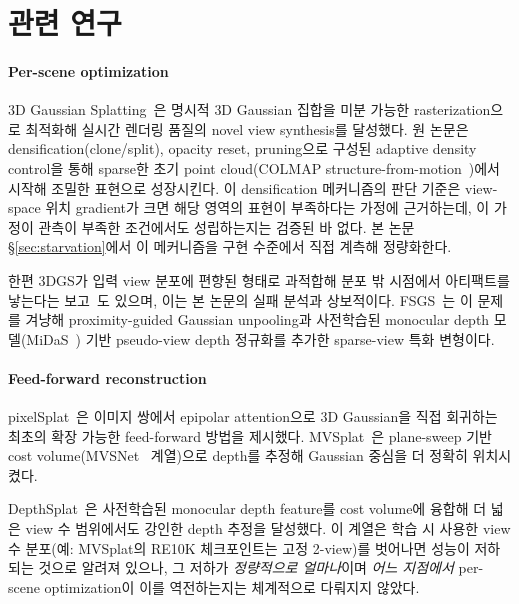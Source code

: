 \section{관련 연구}
\label{sec:related}

\paragraph{Per-scene optimization} 3D Gaussian Splatting~\cite{kerbl20233d}은 명시적 3D Gaussian 집합을 미분 가능한 rasterization으로 최적화해 실시간 렌더링 품질의 novel view synthesis를 달성했다. 원 논문은 densification(clone/split), opacity reset, pruning으로 구성된 adaptive density control을 통해 sparse한 초기 point cloud(COLMAP structure-from-motion~\cite{schoenberger2016sfm})에서 시작해 조밀한 표현으로 성장시킨다. 이 densification 메커니즘의 판단 기준은 view-space 위치 gradient가 크면 해당 영역의 표현이 부족하다는 가정에 근거하는데, 이 가정이 관측이 부족한 조건에서도 성립하는지는 검증된 바 없다. 본 논문 \S\ref{sec:starvation}에서 이 메커니즘을 구현 수준에서 직접 계측해 정량화한다.

한편 3DGS가 입력 view 분포에 편향된 형태로 과적합해 분포 밖 시점에서 아티팩트를 낳는다는 보고~\cite{chen2025splatformer}도 있으며, 이는 본 논문의 실패 분석과 상보적이다. FSGS~\cite{zhu2024fsgs}는 이 문제를 겨냥해 proximity-guided Gaussian unpooling과 사전학습된 monocular depth 모델(MiDaS~\cite{ranftl2022midas}) 기반 pseudo-view depth 정규화를 추가한 sparse-view 특화 변형이다.

\paragraph{Feed-forward reconstruction} pixelSplat~\cite{charatan2024pixelsplat}은 이미지 쌍에서 epipolar attention으로 3D Gaussian을 직접 회귀하는 최초의 확장 가능한 feed-forward 방법을 제시했다. MVSplat~\cite{chen2024mvsplat}은 plane-sweep 기반 cost volume(MVSNet~\cite{yao2018mvsnet} 계열)으로 depth를 추정해 Gaussian 중심을 더 정확히 위치시켰다.

DepthSplat~\cite{xu2025depthsplat}은 사전학습된 monocular depth feature를 cost volume에 융합해 더 넓은 view 수 범위에서도 강인한 depth 추정을 달성했다. 이 계열은 학습 시 사용한 view 수 분포(예: MVSplat의 RE10K 체크포인트는 고정 2-view)를 벗어나면 성능이 저하되는 것으로 알려져 있으나, 그 저하가 \emph{정량적으로 얼마나}이며 \emph{어느 지점에서} per-scene optimization이 이를 역전하는지는 체계적으로 다뤄지지 않았다.

